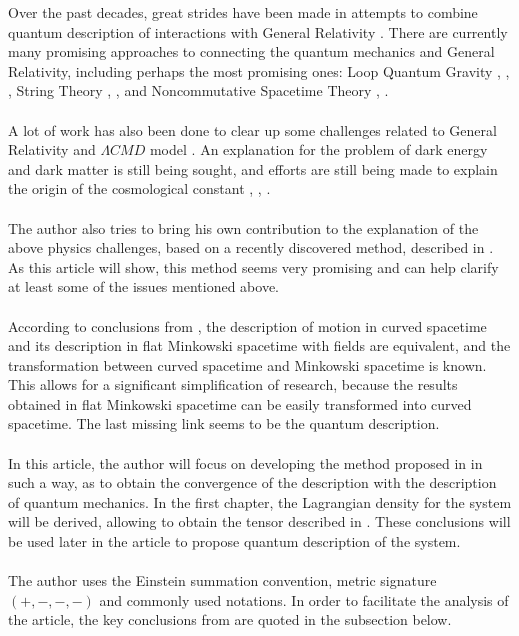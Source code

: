 \documentclass[aps,prx,preprint,groupedaddress,showkeys]{revtex4-2}
\begin{document}
Over the past decades, great strides have been made in attempts to combine quantum description of interactions with General Relativity \cite{INT1}. There are currently many promising approaches to connecting the quantum mechanics and General Relativity, including perhaps the most promising ones: Loop Quantum Gravity \cite{LQG1}, \cite{LQG2}, \cite{LQG3}, String Theory \cite{ST1}, \cite{ST2}, \cite{ST3} and Noncommutative Spacetime Theory \cite{NS1}, \cite{NS2}. \\
~\\
A lot of work has also been done to clear up some challenges related to General Relativity and $\Lambda CMD$ model \cite{LCMD}. An explanation for the problem of dark energy \cite{DE1} and dark matter \cite{DM1} is still being sought, and efforts are still being made to explain the origin of the cosmological constant  \cite{CC1}, \cite{CC2}, \cite{CC3}.\\
~\\
The author also tries to bring his own contribution to the explanation of the above physics challenges, based on a recently discovered method, described in \cite{PMofC}. As this article will show, this method seems very promising and can help clarify at least some of the issues mentioned above.\\
~\\
According to conclusions from \cite{PMofC}, the description of motion in curved spacetime and its description in flat Minkowski spacetime with fields are equivalent, and the transformation between curved spacetime and Minkowski spacetime is known. This allows for a significant simplification of research, because the results obtained in flat Minkowski spacetime can be easily transformed into curved spacetime. The last missing link seems to be the quantum description.\\
~\\
In this article, the author will focus on developing the method proposed in \cite{PMofC} in such a way, as to obtain the convergence of the description with the description of quantum mechanics. In the first chapter, the Lagrangian density for the system will be derived, allowing to obtain the tensor described in \cite{PMofC}. These conclusions will be used later in the article to propose quantum description of the system.\\
~\\ 
The author uses the Einstein summation convention, metric signature $(+,-,-,-)$ and commonly used notations. In order to facilitate the analysis of the article, the key conclusions from \cite{PMofC} are quoted in the subsection below. 
\end{document}

